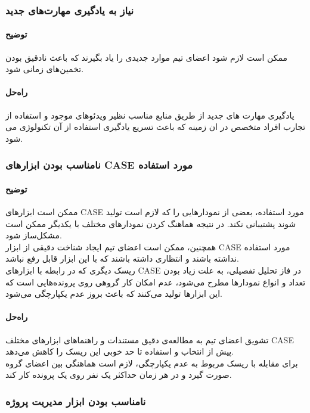 \subsubsection{نیاز به یادگیری مهارت‌های جدید}
\paragraph{توضیح}
ممکن است لازم شود اعضای تیم موارد جدیدی را یاد بگیرند که باعث نادقیق بودن تخمین‌های زمانی شود.
\paragraph{راه‌حل}
یادگیری مهارت های جدید از طریق منابع مناسب نظیر ویدئوهای موجود و استفاده از تجارب افراد متخصص در ان زمینه که باعث تسریع یادگیری استفاده از آن تکنولوژی می شود.
\subsubsection{نامناسب بودن ابزارهای CASE مورد استفاده}
\paragraph{توضیح}
ممکن است ابزارهای CASE مورد استفاده، بعضی از نمودارهایی را که لازم است تولید شوند پشتیبانی نکند. در نتیجه هماهنگ کردن نمودارهای مختلف با یکدیگر ممکن است مشکل‌ساز شود.\\
همچنین، ممکن است اعضای تیم ایجاد شناخت دقیقی از ابزار CASE مورد استفاده نداشته باشند و انتظاری داشته باشند که با این ابزار قابل رفع نباشد. \\
ریسک دیگری که در رابطه با ابزارهای CASE در فاز تحلیل تفصیلی، به علت زیاد بودن تعداد و انواع نمودارها مطرح می‌شود، عدم امکان کار گروهی روی پرونده‌هایی است که این ابزارها تولید می‌کنند که باعث بروز عدم یکپارچگی می‌شود. 

\paragraph{راه‌حل}
تشویق اعضای تیم به مطالعه‌ی دقیق مستندات و 
راهنماهای ابزارهای مختلف CASE پیش از انتخاب و استفاده تا حد خوبی این ریسک را کاهش می‌دهد. \\
برای مقابله با ریسک مربوط به عدم یکپارچگی، لازم است هماهنگی بین اعضای گروه صورت گیرد و در هر زمان حداکثر یک نفر روی یک پرونده کار کند.
\subsubsection{نامناسب بودن ابزار مدیریت پروژه}
